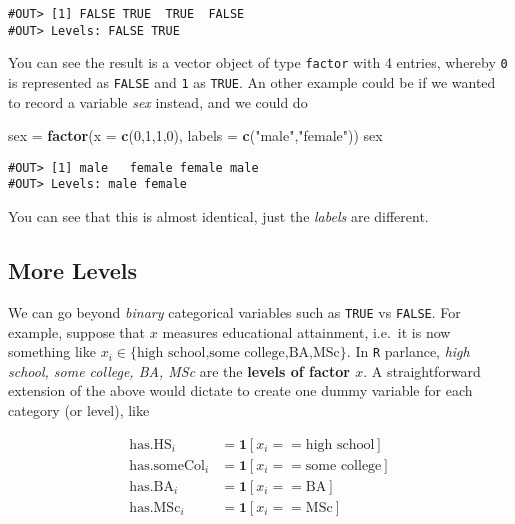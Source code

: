 \documentclass[]{book}
\newenvironment{Shaded}{\begin{snugshade}}{\end{snugshade}}
\newcommand{\KeywordTok}[1]{\textcolor[rgb]{0.13,0.29,0.53}{\textbf{#1}}}
\newcommand{\DataTypeTok}[1]{\textcolor[rgb]{0.13,0.29,0.53}{#1}}
\newcommand{\DecValTok}[1]{\textcolor[rgb]{0.00,0.00,0.81}{#1}}
\newcommand{\StringTok}[1]{\textcolor[rgb]{0.31,0.60,0.02}{#1}}
\newcommand{\NormalTok}[1]{#1}
\begin{document}
\begin{verbatim}
#OUT> [1] FALSE TRUE  TRUE  FALSE
#OUT> Levels: FALSE TRUE
\end{verbatim}

You can see the result is a vector object of type \texttt{factor} with 4
entries, whereby \texttt{0} is represented as \texttt{FALSE} and
\texttt{1} as \texttt{TRUE}. An other example could be if we wanted to
record a variable \emph{sex} instead, and we could do

\begin{Shaded}
\begin{Highlighting}[]
\NormalTok{sex =}\StringTok{ }\KeywordTok{factor}\NormalTok{(}\DataTypeTok{x =} \KeywordTok{c}\NormalTok{(}\DecValTok{0}\NormalTok{,}\DecValTok{1}\NormalTok{,}\DecValTok{1}\NormalTok{,}\DecValTok{0}\NormalTok{), }\DataTypeTok{labels =} \KeywordTok{c}\NormalTok{(}\StringTok{"male"}\NormalTok{,}\StringTok{"female"}\NormalTok{))}
\NormalTok{sex}
\end{Highlighting}
\end{Shaded}

\begin{verbatim}
#OUT> [1] male   female female male  
#OUT> Levels: male female
\end{verbatim}

You can see that this is almost identical, just the \emph{labels} are
different.

\subsection{More Levels}\label{more-levels}

We can go beyond \emph{binary} categorical variables such as
\texttt{TRUE} vs \texttt{FALSE}. For example, suppose that \(x\)
measures educational attainment, i.e.~it is now something like
\(x_i \in \{\text{high school,some college,BA,MSc}\}\). In \texttt{R}
parlance, \emph{high school, some college, BA, MSc} are the
\textbf{levels of factor \(x\)}. A straightforward extension of the
above would dictate to create one dummy variable for each category (or
level), like

\begin{align*}
\text{has.HS}_i &= \mathbf{1}[x_i==\text{high school}] \\
\text{has.someCol}_i &= \mathbf{1}[x_i==\text{some college}] \\
\text{has.BA}_i &= \mathbf{1}[x_i==\text{BA}] \\
\text{has.MSc}_i &= \mathbf{1}[x_i==\text{MSc}] 
\end{align*}
\end{document}
